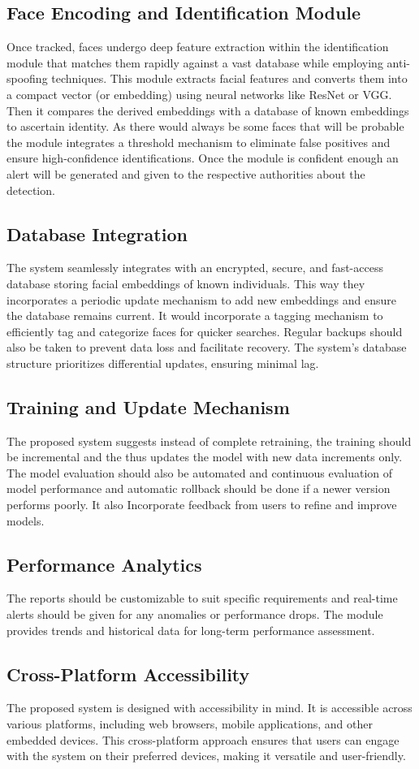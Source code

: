 	\subsection{Face Encoding and Identification Module}
		Once tracked, faces undergo deep feature extraction within the identification module that matches them rapidly against a vast database while employing anti-spoofing techniques. This module extracts facial features and converts them into a compact vector (or embedding) using neural networks like ResNet or VGG. Then it compares the derived embeddings with a database of known embeddings to ascertain identity. As there would always be some faces that will be probable the module integrates a threshold mechanism to eliminate false positives and ensure high-confidence identifications. Once the module is confident enough an alert will be generated and given to the respective authorities about the detection.

	\subsection{Database Integration}
		The system seamlessly integrates with an encrypted, secure, and fast-access database storing facial embeddings of known individuals. This way they incorporates a periodic update mechanism to add new embeddings and ensure the database remains current. It would incorporate a tagging mechanism to efficiently tag and categorize faces for quicker searches. Regular backups should also be taken to prevent data loss and facilitate recovery. The system's database structure prioritizes differential updates, ensuring minimal lag.

	\subsection{Training and Update Mechanism}
		The proposed system suggests instead of complete retraining, the training should be incremental and the thus updates the model with new data increments only. The model evaluation should also be automated and continuous evaluation of model performance and automatic rollback should be done if a newer version performs poorly. It also Incorporate feedback from users to refine and improve models.

	\subsection{Performance Analytics}
		The reports should be customizable to suit specific requirements and real-time alerts should be given for any anomalies or performance drops. The module provides trends and historical data for long-term performance assessment.
		
	\subsection{Cross-Platform Accessibility}
		The proposed system is designed with accessibility in mind. It is accessible across various platforms, including web browsers, mobile applications, and other embedded devices. This cross-platform approach ensures that users can engage with the system on their preferred devices, making it versatile and user-friendly.